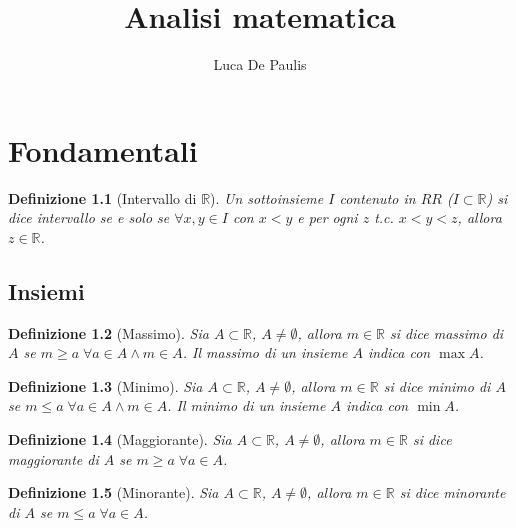 \documentclass{report}
\author{Luca De Paulis}
\title{Analisi matematica}
\newcommand{\AND}{\wedge}
\newcommand{\RR}{\mathbb{R}}
\begin{document}
    \maketitle
    
    \newtheorem{defin}{Definizione}[section]
    \newtheorem*{obs}{Osservazione}
    \newtheorem{theorem}{Teorema}[section]
    \newtheorem{corol}{Corollario}[theorem]

    \chapter{Fondamentali}

    \theoremstyle{definition}
    \begin{defin}
        [Intervallo di $\RR$]
        Un sottoinsieme $I$ contenuto in $RR$ ($I \subset \RR$)
        si dice intervallo se e solo se $\forall x, y \in I$ con $x < y$
        e per ogni $z$ t.c. $x < y < z$, allora $z \in \RR$.
    \end{defin}

    \section{Insiemi}
    \theoremstyle{definition}
    \begin{defin}
        [Massimo]
        Sia $A \subset \RR$, $A \neq \emptyset$, allora $m \in \RR$ si dice massimo 
        di $A$ se ${m \geq a \;\forall a \in A \AND m \in A}$. \newline
        Il massimo di un insieme $A$ indica con $\max{A}$.
    \end{defin}

    \begin{defin}
        [Minimo]
        Sia $A \subset \RR$, $A \neq \emptyset$, allora $m \in \RR$ si dice minimo 
        di $A$ se ${m \leq a \;\forall a \in A \AND m \in A}$. \newline
        Il minimo di un insieme $A$ indica con $\min{A}$.
    \end{defin}

    \begin{defin}
        [Maggiorante]
        Sia $A \subset \RR$, $A \neq \emptyset$, allora $m \in \RR$ si dice maggiorante 
        di $A$ se ${m \geq a \;\forall a \in A}$. \newline
    \end{defin}

    \begin{defin}
        [Minorante]
        Sia $A \subset \RR$, $A \neq \emptyset$, allora $m \in \RR$ si dice minorante 
        di $A$ se ${m \leq a \;\forall a \in A}$. \newline
    \end{defin}
\end{document}
